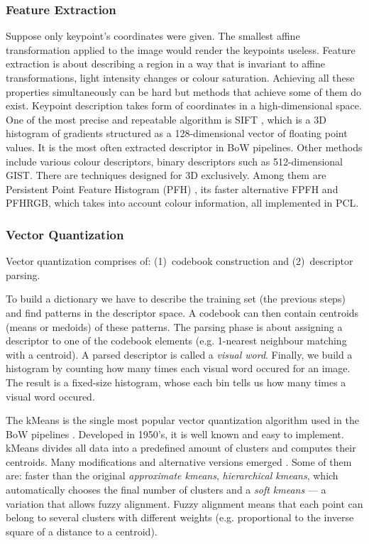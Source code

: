 \documentclass[12pt]{article}
\begin{document}
  \subsubsection{Feature Extraction}
    Suppose only keypoint's coordinates were given. The smallest affine 
transformation applied to the image would render the keypoints useless. Feature 
extraction is about describing a region in a way that is invariant to affine 
transformations, light intensity changes or colour saturation. Achieving all 
these properties simultaneously can be hard but methods that achieve some of 
them do exist. Keypoint description takes form of coordinates in a 
high-dimensional space. One of the most precise and repeatable algorithm is 
SIFT \cite{sift_features}, which is a 3D histogram of gradients structured as a 
128-dimensional vector of floating point values. It is the most often extracted 
descriptor in BoW pipelines. Other methods include various colour descriptors, 
binary descriptors such as 512-dimensional GIST. There are 
techniques designed for 3D exclusively. Among them are Persistent Point Feature 
Histogram (PFH) , its faster alternative FPFH 
 and PFHRGB, which takes into account colour information, 
all implemented in PCL.
    
  \subsubsection{Vector Quantization}
    Vector quantization comprises of: (1)~codebook construction and 
(2)~descriptor parsing. 

To build a dictionary we have to describe the training set (the previous steps) 
and find patterns in the descriptor space. A codebook can then contain 
centroids (means or medoids) of these patterns. The parsing phase is about 
assigning a descriptor to one of the codebook elements (e.g. 1-nearest 
neighbour matching with a centroid). A parsed descriptor is called a 
\textit{visual word}. Finally, we build a histogram by counting how many times 
each visual word occured for an image. The result is a fixed-size histogram, 
whose each bin tells us how many times a visual word occured.

    The kMeans is the single most popular vector quantization algorithm used in 
the BoW pipelines \cite{tsai2012bag}. Developed in 1950's, it is well known and 
easy to implement. kMeans divides all data into a predefined amount of clusters 
and computes their centroids. Many modifications and alternative versions 
emerged \cite{kmeans_jain2010data}. Some of them are: faster than the original 
\emph{approximate kmeans}, \emph{hierarchical kmeans}, which automatically 
chooses the final number of clusters and a \emph{soft kmeans} --- a variation 
that allows fuzzy alignment. Fuzzy alignment means that each point can belong 
to several clusters with different weights (e.g. proportional to the inverse 
square of a distance to a centroid). 
    
\end{document}
